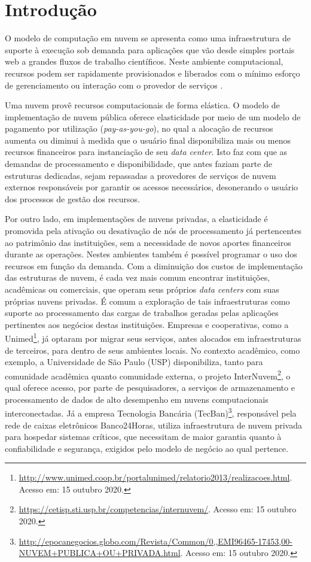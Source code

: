 \documentclass[tese,capa]{texufpel}
\begin{document}
\chapter{Introdução}

O modelo de computação em nuvem se apresenta como uma infraestrutura de suporte à execução sob demanda para aplicações que vão desde simples portais web a grandes fluxos de trabalho científicos. Neste ambiente computacional, recursos podem ser rapidamente provisionados e liberados com o mínimo esforço de gerenciamento ou interação com o provedor de serviços \cite{mell_nist_2011}.

Uma nuvem provê recursos computacionais de forma elástica. O modelo de implementação de nuvem pública oferece elasticidade por meio de um modelo de pagamento por utilização (\textit{pay-as-you-go}), no qual a alocação de recursos aumenta ou diminui à medida que o usuário final disponibiliza mais ou menos recursos financeiros para instanciação de seu \emph{data center}. Isto faz com que as demandas de processamento e disponibilidade, que antes faziam parte de estruturas dedicadas, sejam repassadas a provedores de serviços de nuvem externos responsáveis por garantir os acessos necessários, desonerando o usuário dos processos de gestão dos recursos.

Por outro lado, em implementações de nuvens privadas, a elasticidade é promovida pela  ativação ou desativação de nós de processamento já pertencentes ao patrimônio das instituições, sem a necessidade de novos aportes financeiros durante as operações. Nestes ambientes também é possível programar o uso dos recursos em função da demanda. Com a diminuição dos custos de implementação das estruturas de nuvem, é cada vez mais comum encontrar instituições, acadêmicas ou comerciais, que operam seus próprios \emph{data centers} com suas próprias nuvens privadas. É comum a exploração de tais infraestruturas como suporte ao processamento das cargas de trabalhos geradas pelas aplicações pertinentes aos negócios destas instituições. Empresas e cooperativas, como a Unimed\footnote{\url{http://www.unimed.coop.br/portalunimed/relatorio2013/realizacoes.html}. Acesso em: 15 outubro 2020.}, já optaram por migrar seus serviços, antes alocados em infraestruturas de terceiros, para dentro de seus ambientes locais. No contexto acadêmico, como exemplo, a Universidade de São Paulo (USP) disponibiliza, tanto para comunidade acadêmica quanto comunidade externa, o projeto InterNuvem\footnote{\url{https://cetisp.sti.usp.br/competencias/internuvem/}. Acesso em: 15 outubro 2020.}, o qual oferece acesso, por parte de pesquisadores, a serviços de armazenamento e processamento de dados de alto desempenho em nuvens computacionais interconectadas. Já a empresa Tecnologia Bancária (TecBan)\footnote{\url{http://epocanegocios.globo.com/Revista/Common/0,,EMI96465-17453,00-NUVEM+PUBLICA+OU+PRIVADA.html}. Acesso em: 15 outubro 2020.}, responsável pela rede de caixas eletrônicos Banco24Horas, utiliza infraestrutura de nuvem privada para hospedar sistemas críticos, que necessitam de maior garantia quanto à confiabilidade e segurança, exigidos pelo modelo de negócio ao qual pertence.
\end{document}
